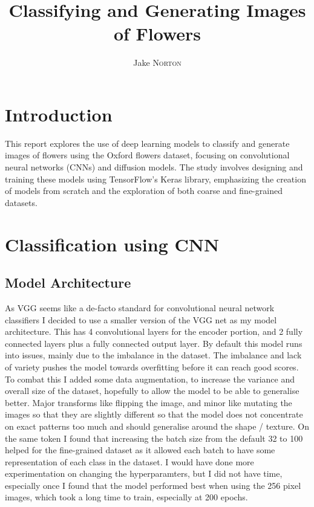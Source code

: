 \documentclass[12pt]{article}
\title{Classifying and Generating Images of Flowers}
\author{Jake \textsc{Norton}}
\begin{document}
\maketitle

\section{Introduction}

This report explores the use of deep learning models to classify and generate images of flowers using the Oxford flowers dataset, 
focusing on convolutional neural networks (CNNs) and diffusion models. The study involves designing and training these models using 
TensorFlow's Keras library, emphasizing the creation of models from scratch and the exploration of both coarse and fine-grained datasets.


\section{Classification using CNN}
\subsection{Model Architecture}
As VGG seems like a de-facto standard for convolutional neural network classifiers I decided to use a smaller version of the VGG net as my model architecture. 
This has 4 convolutional layers for the encoder portion, and 2 fully connected layers plus a fully connected output layer. By default this model runs into issues,
mainly due to the imbalance in the dataset. The imbalance and lack of variety pushes the model towards overfitting before it can reach good scores. To combat this
I added some data augmentation, to increase the variance and overall size of the dataset, hopefully to allow the model to be able to generalise better. Major 
transforms like flipping the image, and minor like mutating the images so that they are slightly different so that the model does not concentrate on exact patterns 
too much and should generalise around the shape / texture. On the same token I found that increasing the batch size from the default 32 to 100 helped for the fine-grained
dataset as it allowed each batch to have some representation of each class in the dataset. I would have done more experimentation on changing the hyperparamters, but I did 
not have time, especially once I found that the model performed best when using the 256 pixel images, which took a long time to train, especially at 200 epochs.
\end{document}

